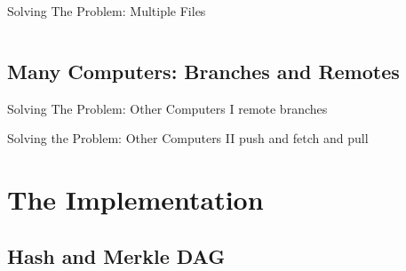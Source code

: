 \documentclass[xetex, handout]{beamer}
\begin{document}
\begin{frame}[fragile]{Solving The Problem: Multiple Files}
  \begin{columns}
    \begin{column}{.5\linewidth}
    \end{column}
    \begin{column}{.5\linewidth}
    \end{column}
  \end{columns}
\end{frame}

\subsection{Many Computers: Branches and Remotes}

\begin{frame}{Solving The Problem: Other Computers I}
  remote branches
\end{frame}

\begin{frame}{Solving the Problem: Other Computers II}
  push and fetch and pull
\end{frame}


\section{The Implementation}

\subsection{Hash and Merkle DAG}
\end{document}
